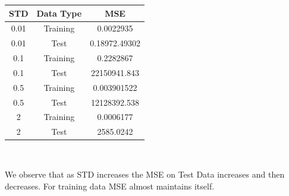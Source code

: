 \documentclass[a4paper]{article}
\theoremstyle{definition}
\newenvironment{soln}{
    \leavevmode\color{blue}\ignorespaces
}{}
\begin{document}
\begin{soln}
\begin{center}
      
        \begin{tabular}{|c|c|c|}
            \hline
            STD &Data Type & MSE \\
            \hline
            0.01 & Training & 0.0022935\\
            0.01 & Test & 0.18972.49302\\
            0.1 & Training & 0.2282867\\
            0.1 & Test & 22150941.843\\
            0.5 & Training & 0.003901522\\
            0.5 & Test & 12128392.538\\
            2 & Training & 0.0006177\\
            2 & Test & 2585.0242\\
            
            
            \hline
        \end{tabular}\\
          \end{center}
    We observe that as STD increases the MSE on Test Data increases and then decreases. For training data MSE almost maintains itself.
\end{soln}


\end{document}
